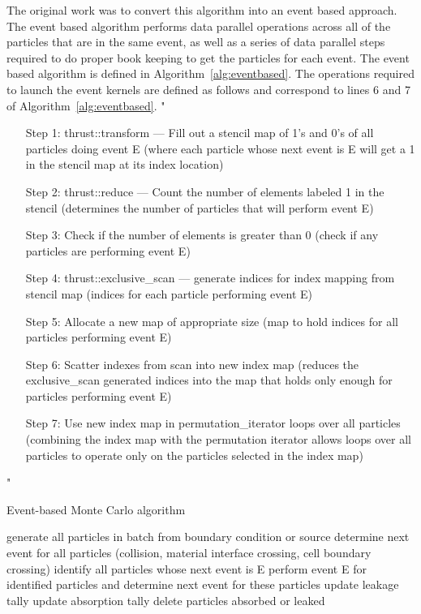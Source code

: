 %
The original work was to convert this algorithm into an event based approach.
%
The event based algorithm performs data parallel operations across all of the particles that are in the same event, as well as a series of data parallel steps required to do proper book keeping to get the particles for each event.
%
The event based algorithm is defined in Algorithm~\ref{alg:eventbased}.
%
The operations required to launch the event kernels are defined as follows and correspond to lines 6 and 7 of Algorithm~\ref{alg:eventbased}.
%
"
\begin{itemize}
\item[Step 1:] thrust::transform --- Fill out a stencil map of 1's and 0's of all particles doing event E (where each particle whose next event is E will get a 1 in the stencil map at its index location)
\item[Step 2:] thrust::reduce --- Count the number of elements labeled 1 in the stencil (determines the number of particles that will perform event E)
\item[Step 3:] Check if the number of elements is greater than 0 (check if any particles are performing event E)
\item[Step 4:] thrust::exclusive\_scan --- generate indices for index mapping from stencil map (indices for each particle performing event E)
\item[Step 5:] Allocate a new map of appropriate size (map to hold indices for all particles performing event E)
\item[Step 6:] Scatter indexes from scan into new index map (reduces the exclusive\_scan generated indices into the map that holds only enough for particles performing event E)
\item[Step 7:] Use new index map in permutation\_iterator loops over all particles (combining the index map with the permutation iterator allows loops over all particles to operate only on the particles selected in the index map)
\end{itemize}
"~\cite{}
%

\begin{algorithm}
\DontPrintSemicolon
\caption{Event-based Monte Carlo algorithm}
\label{alg:eventbased}
{ 
    generate all particles in batch from boundary condition or source\;
    determine next event for all particles (collision, material interface crossing, cell boundary crossing)\;
    {
       {
          identify all particles whose next event is E\;
          perform event E for identified particles and determine next event for these particles\;
       }
       {
          update leakage tally\;
       }
       {
          update absorption tally\;
       }
       delete particles absorbed or leaked\;
    }
}
\end{algorithm}

